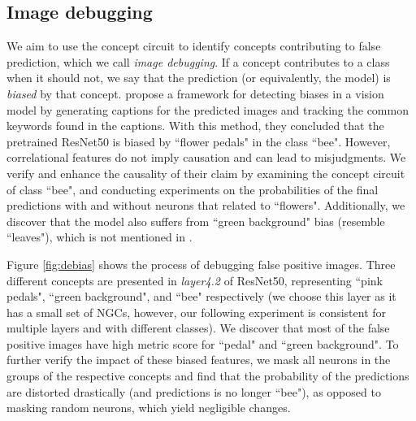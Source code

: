 \subsection{Image debugging}
\label{debugging}
We aim to use the concept circuit to identify concepts contributing to false prediction, which we call \textit{image debugging}. If a concept contributes to a class when it should not, we say that the prediction (or equivalently, the model) is \textit{biased} by that concept. \citet{Debias} propose a framework for detecting biases in a vision model by generating captions for the predicted images and tracking the common keywords found in the captions. With this method, they concluded that the pretrained ResNet50 is biased by ``flower pedals" in the class ``bee". However, correlational features do not imply causation and can lead to misjudgments. We verify and enhance the causality of their claim by examining the concept circuit of class ``bee", and conducting experiments on the probabilities of the final predictions with and without neurons that related to ``flowers". Additionally, we discover that the model also suffers from ``green background" bias (resemble ``leaves"), which is not mentioned in \citet{Debias}. 

Figure \ref{fig:debias} shows the process of debugging false positive images. Three different concepts are presented in \textit{layer4.2} of ResNet50, representing ``pink pedals", ``green background", and ``bee" respectively (we choose this layer as it has a small set of NGCs, however, our following experiment is consistent for multiple layers and with different classes). We discover that most of the false positive images have high metric score for ``pedal" and ``green background". 
To further verify the impact of these biased features, we mask all neurons in the groups of the respective concepts and find that the probability of the predictions are distorted drastically (and predictions is no longer ``bee"), as opposed to masking random neurons, which yield negligible changes. 

